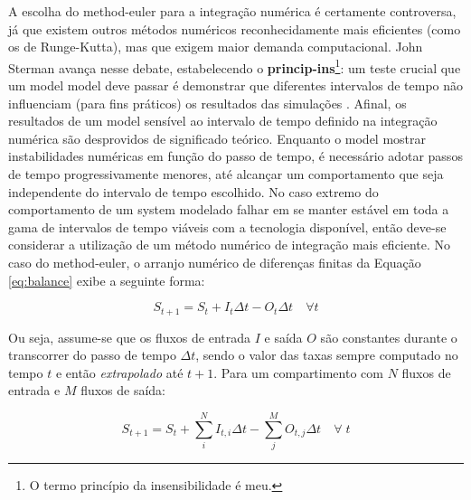 \documentclass[./main.tex]{subfiles}
\begin{document}
\par A escolha do \gls{method-euler} para a integração numérica é certamente controversa, já que existem outros métodos numéricos reconhecidamente mais eficientes (como os de Runge-Kutta), mas que exigem maior demanda computacional. John Sterman avança nesse debate, estabelecendo o \textbf{\gls{princip-ins}}\footnote{O termo princípio da insensibilidade é meu.}: um teste crucial que um \gls{model} \gls{model} deve passar é demonstrar que diferentes intervalos de tempo não influenciam (para fins práticos) os resultados das simulações \cite{sterman2000}. Afinal, os resultados de um \gls{model} sensível ao intervalo de tempo definido na integração numérica são desprovidos de significado teórico. Enquanto o \gls{model} mostrar instabilidades numéricas em função do passo de tempo, é necessário adotar passos de tempo progressivamente menores, até alcançar um comportamento que seja independente do intervalo de tempo escolhido. No caso extremo do comportamento de um \gls{system} modelado falhar em se manter estável em toda a gama de intervalos de tempo viáveis com a tecnologia disponível, então deve-se considerar a utilização de um método numérico de integração mais eficiente. No caso do \gls{method-euler}, o arranjo numérico de diferenças finitas da Equação \eqref{eq:balance} exibe a seguinte forma:
\begin{linenomath*}
\begin{equation} 
	\label{eq:balance_numeric}
	S_{t+1} = S_{t} + I_{t}\Delta t - O_{t}\Delta t \quad \forall t
\end{equation}
\end{linenomath*}
Ou seja, assume-se que os fluxos de entrada $I$ e saída $O$ são constantes durante o transcorrer do passo de tempo $\Delta t$, sendo o valor das taxas sempre computado no tempo $t$ e então \textit{extrapolado} até $t+1$. Para um compartimento com $N$ fluxos de entrada e $M$ fluxos de saída:
\begin{linenomath*}
\begin{equation} 
	\label{eq:balance_numeric_expanded}
	S_{t+1} = S_{t} + \sum_{i}^{N} I_{t, i}\Delta t - \sum_{j}^{M}O_{t, j}\Delta t \quad \forall \; t
\end{equation}
\end{linenomath*}
\end{document}
